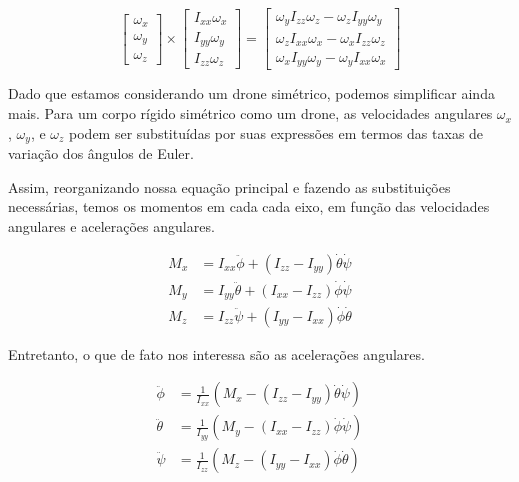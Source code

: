 \begin{equation}
\begin{bmatrix}
\omega_x \\
\omega_y \\
\omega_z
\end{bmatrix}
\times
\begin{bmatrix}
I_{xx} \omega_x \\
I_{yy} \omega_y \\
I_{zz} \omega_z
\end{bmatrix}
=
\begin{bmatrix}
\omega_y I_{zz} \omega_z - \omega_z I_{yy} \omega_y \\
\omega_z I_{xx} \omega_x - \omega_x I_{zz} \omega_z \\
\omega_x I_{yy} \omega_y - \omega_y I_{xx} \omega_x
\end{bmatrix}
\end{equation}

Dado que estamos considerando um drone simétrico, podemos simplificar ainda mais. Para um corpo rígido simétrico como um drone, as velocidades angulares 
$\omega_x$, $\omega_y$, e $\omega_z$ podem ser substituídas por suas expressões em termos das taxas de variação dos ângulos de Euler.

Assim, reorganizando nossa equação principal e fazendo as substituições necessárias, temos os momentos em cada cada eixo, em função das velocidades angulares e acelerações angulares. 

\begin{align}
	M_x &= I_{xx} \ddot{\phi} + (I_{zz} - I_{yy}) \dot{\theta} \dot{\psi} \\
	M_y &= I_{yy} \ddot{\theta} + (I_{xx} - I_{zz}) \dot{\phi} \dot{\psi} \\
	M_z &= I_{zz} \ddot{\psi} + (I_{yy} - I_{xx}) \dot{\phi} \dot{\theta}
\end{align}

Entretanto, o que de fato nos interessa são as acelerações angulares.

\begin{align}
	\ddot{\phi} &= \frac{1}{I_{xx}} \left( M_x - (I_{zz} - I_{yy}) \dot{\theta} \dot{\psi} \right) \\
	\ddot{\theta} &= \frac{1}{I_{yy}} \left( M_y - (I_{xx} - I_{zz}) \dot{\phi} \dot{\psi} \right) \\
	\ddot{\psi} &= \frac{1}{I_{zz}} \left( M_z - (I_{yy} - I_{xx}) \dot{\phi} \dot{\theta} \right)
\end{align}

